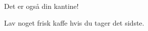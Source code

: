 \documentclass{article}
\begin{document}
\hovedoverskrift{}

\maketitle

\begin{center}
  \fontsize{72}{18}\selectfont
  Det er også din kantine!

\vspace{2cm}

  \fontsize{48}{18}\selectfont
  Lav noget frisk kaffe hvis du tager det sidste.
\end{center}

\underskriv
\end{document}
